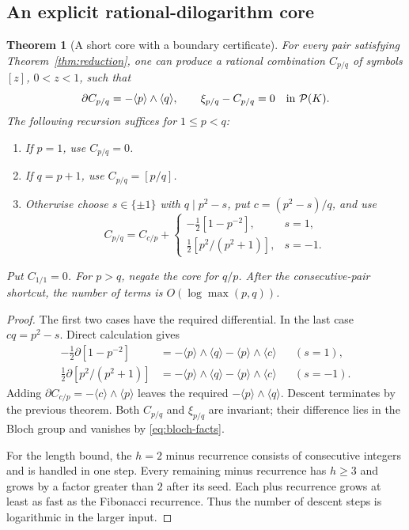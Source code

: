 \documentclass[11pt]{article}
\numberwithin{equation}{section}
\newtheorem{theorem}{Theorem}[section]
\theoremstyle{definition}
\theoremstyle{remark}
\newcommand{\Pcal}{\mathcal P}
\newcommand{\cl}[1]{\langle #1\rangle}
\begin{document}
\subsection{An explicit rational-dilogarithm core}

\begin{theorem}[A short core with a boundary certificate]\label{thm:core}
For every pair satisfying Theorem~\ref{thm:reduction}, one can produce
a rational combination $C_{p/q}$ of symbols $[z]$, $0<z<1$, such that
\[
 \partial C_{p/q}=-\cl p\wedge\cl q,
 \qquad \xi_{p/q}-C_{p/q}=0\quad\hbox{in }\Pcal(K).
\]
The following recursion suffices for $1\le p<q$:
\begin{enumerate}
\item If $p=1$, use $C_{p/q}=0$.
\item If $q=p+1$, use $C_{p/q}=[p/q]$.
\item Otherwise choose $s\in\{\pm1\}$ with $q\mid p^2-s$, put
      $c=(p^2-s)/q$, and use
\begin{equation}\label{eq:core-recursion}
 C_{p/q}=C_{c/p}+
 \begin{cases}
 -\tfrac12[1-p^{-2}],&s=1,\\
 \tfrac12[p^2/(p^2+1)],&s=-1.
 \end{cases}
\end{equation}
\end{enumerate}
Put $C_{1/1}=0$. For $p>q$, negate the core for $q/p$.
After the consecutive-pair shortcut,
the number of terms is $O(\log\max(p,q))$.
\end{theorem}
\begin{proof}
The first two cases have the required differential. In the last case
$cq=p^2-s$. Direct calculation gives
\begin{align*}
 -\tfrac12\partial[1-p^{-2}]
   &=-\cl p\wedge\cl q-\cl p\wedge\cl c &&(s=1),\\
 \tfrac12\partial[p^2/(p^2+1)]
   &=-\cl p\wedge\cl q-\cl p\wedge\cl c &&(s=-1).
\end{align*}
Adding $\partial C_{c/p}=-\cl c\wedge\cl p$ leaves the required
$-\cl p\wedge\cl q$. Descent terminates by the previous theorem.
Both $C_{p/q}$ and $\xi_{p/q}$ are invariant; their difference lies in
the Bloch group and vanishes by \eqref{eq:bloch-facts}.

For the length bound, the $h=2$ minus recurrence consists of consecutive
integers and is handled in one step. Every remaining minus recurrence
has $h\ge3$ and grows by a factor greater than $2$ after its seed.
Each plus recurrence grows at least as fast as the Fibonacci recurrence.
Thus the number of descent steps is logarithmic in the larger input.
\end{proof}
\end{document}
